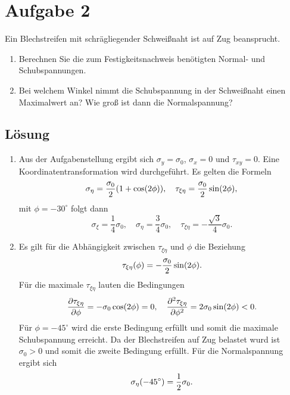 \documentclass{exercise}
\begin{document}
    
    \section*{Aufgabe 2}

    \begin{problem}
        Ein Blechstreifen mit schrägliegender Schweißnaht ist auf Zug beansprucht.
        \begin{enumerate}
            \item Berechnen Sie die zum Festigkeitsnachweis benötigten Normal- und Schubspannungen.
            \item Bei welchem Winkel nimmt die Schubspannung in der Schweißnaht einen Maximalwert an?
            Wie groß ist dann die Normalspannung?
        \end{enumerate}
    \end{problem}

    \subsection*{Lösung}
    \begin{enumerate}
        \item Aus der Aufgabenstellung ergibt sich \(\sigma_y = \sigma_0\), \(\sigma_x = 0\) und \(\tau_{xy} = 0\).
        Eine Koordinatentransformation wird durchgeführt.
        Es gelten die Formeln
        \[
            \sigma_\eta = \frac{\sigma_0}{2}\parentheses*{1 + \cos\parentheses*{2\phi}}, \quad \tau_{\xi\eta} = \frac{\sigma_0}{2}\sin\parentheses*{2\phi},
        \]
        mit \(\phi = -30^\circ\) folgt dann
        \[
            \sigma_\xi = \frac{1}{4}\sigma_0, \quad \sigma_\eta = \frac{3}{4}\sigma_0, \quad \tau_{\xi\eta} = -\frac{\sqrt{3}}{4}\sigma_0.
        \]
        \item Es gilt für die Abhängigkeit zwischen \(\tau_{\xi\eta}\) und \(\phi\) die Beziehung
        \[
            \tau_{\xi\eta}\parentheses*{\phi} = -\frac{\sigma_0}{2}\sin\parentheses*{2\phi}.
        \]
        Für die maximale \(\tau_{\xi\eta}\) lauten die Bedingungen
        \[
            \frac{\partial\tau_{\xi\eta}}{\partial\phi} = -\sigma_0\cos\parentheses*{2\phi} = 0, \quad \frac{\partial^2\tau_{\xi\eta}}{\partial\phi^2} = 2\sigma_0\sin\parentheses*{2\phi} < 0.
        \]
        Für \(\phi = -45^\circ\) wird die erste Bedingung erfüllt und somit die maximale Schubspannung erreicht.
        Da der Blechstreifen auf Zug belastet wurd ist \(\sigma_0 > 0\) und somit die zweite Bedingung erfüllt.
        Für die Normalspannung ergibt sich
        \[
            \sigma_\eta\parentheses*{-45^\circ} = \frac{1}{2}\sigma_0.
        \]
    \end{enumerate}
\end{document}
